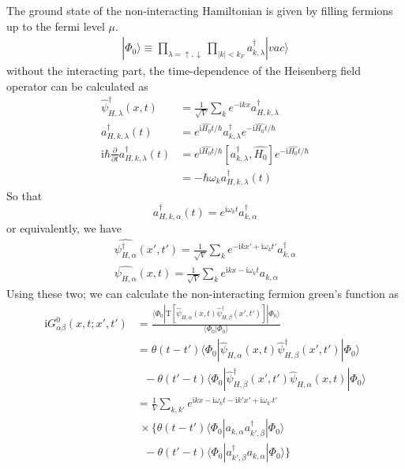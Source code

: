 The ground state of the non-interacting Hamiltonian is given by filling fermions up to the fermi level $\mu$.
\begin{align}
|\Phi_0\rangle \equiv \prod_{\lambda=\uparrow,\downarrow}\prod_{|k|<k_F} a^{\dagger}_{k,\lambda}|vac\rangle \nonumber
\end{align}
without the interacting  part, the time-dependence of the Heisenberg field operator can be calculated as
\begin{align}
\hat\psi^{\dagger}_{H,\lambda}(x,t)&=\frac{1}{\sqrt{V}}\sum_{k}e^{-\mathrm{i}kx}a_{H,k,\lambda}^{\dagger}\nonumber \\
a_{H,k,\lambda}^{\dagger}(t)&=e^{\mathrm{i}\hat{H_0}t/\hbar}a_{k,\lambda}^{\dagger}e^{-\mathrm{i}\hat{H_0}t/\hbar}\nonumber \\
\mathrm{i}\hbar \frac{\partial}{\partial  t} a_{H,k,\lambda}^{\dagger}(t)&=e^{\mathrm{i}\hat{H_0}t/\hbar}[a_{k,\lambda}^{\dagger},\hat{H_0}]e^{-\mathrm{i}\hat{H_0}t/\hbar}\nonumber \\
&=-\hbar \omega_k a_{H,k,\lambda}^{\dagger}(t) \nonumber
\end{align}
So that
\begin{equation}
a^{\dagger}_{H,k,\alpha}(t)=e^{\mathrm{i}\omega_{k}t}a^{\dagger}_{k,\alpha} \nonumber
\end{equation}
or equivalently, we have 
\begin{align}\label{2.3.5}
\hat{\psi_{H,\alpha}^{\dagger}}(x',t')=\frac{1}{\sqrt{V}}\sum_{k}e^{-\mathrm{i}kx'+\mathrm{i}\omega_kt'}a^{\dagger}_{k,\alpha} \nonumber \\
\hat{\psi_{H,\alpha}}(x,t)=\frac{1}{\sqrt{V}}\sum_{k}e^{\mathrm{i}kx-\mathrm{i}\omega_kt}a_{k,\alpha}
\end{align}
Using these two; we can calculate the non-interacting fermion green's function as
\begin{align}
\mathrm{i}G^0_{\alpha\beta}(x,t;x',t')&=\frac{\langle\Phi_0|\mathrm{T}[\hat \psi_{H,\alpha}(x,t)\hat \psi^\dagger_{H,\beta} (x',t')]|\Phi_0\rangle}{\langle\Phi_0|\Phi_0\rangle} \nonumber \\
&=\theta(t-t')\langle\Phi_0|\hat \psi_{H,\alpha}(x,t)\hat \psi^{
\dagger}_{H,\beta} (x',t')|\Phi_0\rangle \nonumber \\
& \ \ \ -\theta(t'-t)\langle\Phi_0|\hat \psi^{
\dagger}_{H,\beta}(x',t')\hat \psi_{H,\alpha} (x,t)|\Phi_0\rangle \nonumber \\
&=\frac{1}{V}\sum_{k,k'}e^{\mathrm{i}kx-\mathrm{i}\omega_kt-\mathrm{i}k'x'+\mathrm{i}\omega_{k'}t'} \nonumber \\
&\  \times\{\theta(t-t')\langle\Phi_0|a_{k,\alpha}a^{\dagger}_{k',\beta}|\Phi_0\rangle \nonumber \\
& \ \ \ -\theta(t'-t)\langle\Phi_0|a^{\dagger}_{k',\beta}a_{k,\alpha}|\Phi_0\rangle \} \nonumber 
\end{align}

